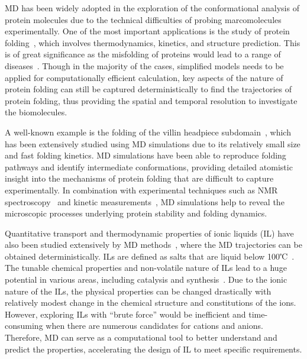 \documentclass[a4paper,10pt,twocolumn]{article}
\begin{document}
MD has been widely adopted in the exploration of the conformational analysis of protein molecules due to the technical difficulties of probing marcomolecules experimentally. One of the most important applications is the study of protein folding~\cite{karplus2005molecular,swope2004describing,sugita1999replica}, which involves thermodynamics, kinetics, and
structure prediction. This is of great significance as the misfolding of proteins would lead to a range of diseases~\cite{dobson2003protein}. Though in the majority of the cases, simplified models needs to be applied for computationally efficient calculation, key aspects of the nature of protein folding can still be captured deterministically to find the trajectories of protein folding, thus providing the spatial and temporal resolution to investigate the biomolecules. 

A well-known example is the folding of the villin headpiece subdomain~\cite{lei2010folding}, which has been extensively studied using MD simulations due to its relatively small size and fast folding kinetics. MD simulations have been able to reproduce folding pathways and identify intermediate conformations, providing detailed atomistic insight into the mechanisms of protein folding that are difficult to capture experimentally. In combination with experimental techniques such as NMR spectroscopy~\cite{mcknight1997nmr} and kinetic measurements~\cite{zhu2011evidence}, MD simulations help to reveal the microscopic processes underlying protein stability and folding dynamics.

Quantitative transport and thermodynamic properties of ionic liquids (IL) have also been studied extensively by MD methods~\cite{maginn2007atomistic,cadena2006molecular}, where the MD trajectories can be obtained deterministically. ILs are defined as salts that are liquid below 100℃~\cite{cadena2006molecular}. The tunable chemical properties and non-volatile nature of ILs lead to a huge potential in various areas, including catalysis and synthesis~\cite{rogers2002ionic,steinrueck2015ionic}. Due to the ionic nature of the ILs, the physical properties can be changed drastically with relatively modest change in the chemical structure and constitutions of the ions. However, exploring ILs with ``brute force'' would be inefficient and time-consuming when there are numerous candidates for cations and anions. Therefore, MD can serve as a computational tool to better understand and predict the properties, accelerating the design of IL to meet specific requirements.
\end{document}
